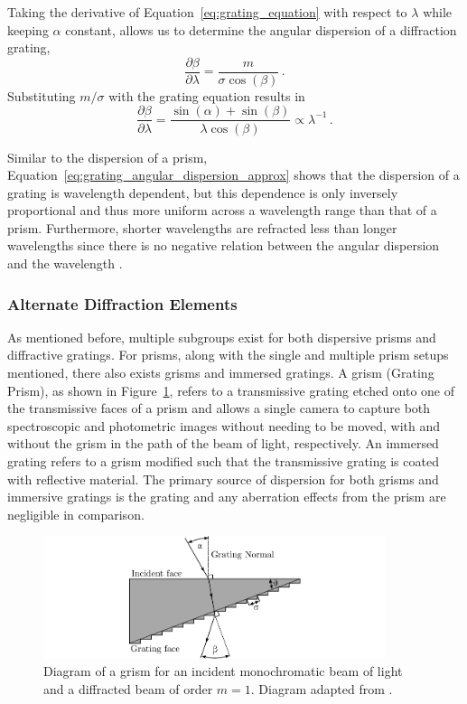 Taking the derivative of Equation~\ref{eq:grating_equation} with respect to $\lambda$ while keeping $\alpha$ constant, allows us to determine the angular dispersion of a diffraction grating,
\begin{equation}
    \frac{\partial \beta}{\partial \lambda} = \frac{m}{\sigma \cos(\beta)}\,.\label{eq:grating_angular_dispersion}
\end{equation}
Substituting $m / \sigma$ with the grating equation results in
\begin{equation}
    \frac{\partial \beta}{\partial \lambda} = \frac{\sin(\alpha) + \sin(\beta)}{\lambda \cos(\beta)} \propto \lambda^{-1}\,.\label{eq:grating_angular_dispersion_approx}
\end{equation}

Similar to the dispersion of a prism, Equation~\ref{eq:grating_angular_dispersion_approx} shows that the dispersion of a grating is wavelength dependent, but this dependence is only inversely proportional and thus more uniform across a wavelength range than that of a prism. Furthermore, shorter wavelengths are refracted less than longer wavelengths since there is no negative relation between the angular dispersion and the wavelength \citep{BirneyObsAstro, Hecht_optics}.

\subsubsection{Alternate Diffraction Elements}

As mentioned before, multiple subgroups exist for both dispersive prisms and diffractive gratings. For prisms, along with the single and multiple prism setups mentioned, there also exists grisms and immersed gratings. A grism (Grating Prism), as shown in Figure~\ref{fig:grism}, refers to a transmissive grating etched onto one of the transmissive faces of a prism and allows a single camera to capture both spectroscopic and photometric images without needing to be moved, with and without the grism in the path of the beam of light, respectively. An immersed grating refers to a grism modified such that the transmissive grating is coated with reflective material. The primary source of dispersion for both grisms and immersive gratings is the grating and any aberration effects from the prism are negligible in comparison.

\begin{figure}[t]
    \centering
    \includegraphics[width = 10cm]{figures/2_grism.pdf}
    \caption{Diagram of a grism for an incident monochromatic beam of light and a diffracted beam of order $m = 1$. Diagram adapted from \cite{BirneyObsAstro}.}
    \label{fig:grism}
\end{figure}

